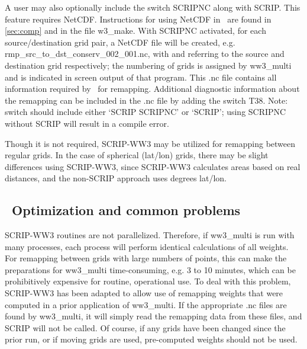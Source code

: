 A user may also optionally include the switch {\F SCRIPNC} along with {\F
  SCRIP}. This feature requires NetCDF. Instructions for using NetCDF in \ws\
are found in \para\ref{sec:comp} and in the file {\file w3\_make}. With {\F
  SCRIPNC} activated, for each source/destination grid pair, a NetCDF file
will be created, e.g. {\file rmp\_src\_to\_dst\_conserv\_002\_001.nc}, with
{\file 002} and {\file 001} referring to the source and destination grid
respectively; the numbering of grids is assigned by {\file ww3\_multi} and is
indicated in screen output of that program. This {\file .nc} file contains all
information required by \ws\ for remapping. Additional diagnostic information
about the remapping can be included in the {\file .nc} file by adding the
switch {\F T38}. Note: {\file switch} should include either {\F `SCRIP
  SCRIPNC'} or {\F `SCRIP'}; using {\F SCRIPNC} without {\F SCRIP} will result
in a compile error.

Though it is not required, SCRIP-WW3 may be utilized for remapping between
regular grids. In the case of spherical (lat/lon) grids, there may be slight
differences using SCRIP-WW3, since SCRIP-WW3 calculates areas based on real
distances, and the non-SCRIP approach uses degrees lat/lon.

\vssub
\subsection{~Optimization and common problems} \label{sec:scripD}
\vssub

SCRIP-WW3 routines are not parallelized. Therefore, if {\file ww3\_multi} is
run with many processes, each process will perform identical calculations of
all weights. For remapping between grids with large numbers of points, this
can make the preparations for {\file ww3\_multi} time-consuming, e.g. 3 to 10
minutes, which can be prohibitively expensive for routine, operational use. To
deal with this problem, SCRIP-WW3 has been adapted to allow use of remapping
weights that were computed in a prior application of {\file ww3\_multi}. If
the appropriate {\file .nc} files are found by {\file ww3\_multi}, it will
simply read the remapping data from these files, and SCRIP will not be
called. Of course, if any grids have been changed since the prior run, or if
moving grids are used, pre-computed weights should not be used.

